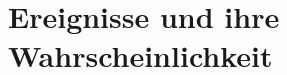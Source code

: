 \newcommand{\titleinfo}{Wahrscheinlichkeitsrechnung und Statistik - Formelsammlung}
\newcommand{\authorinfo}{Braun \& Co, J.Rast}
\newcommand{\versioninfo}{$Revision: 1 $ - powered by \LaTeX} 

%




\setlength{\parindent}{0pt}
\section{Ereignisse und ihre Wahrscheinlichkeit}
